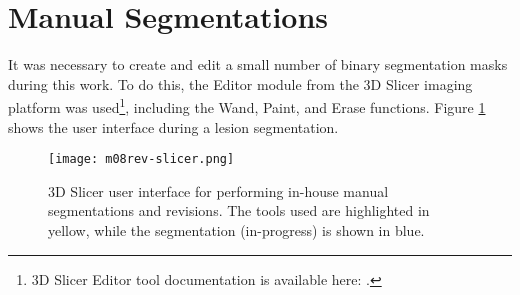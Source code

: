 \section{Manual Segmentations}
It was necessary to create and edit a small number of binary segmentation masks during this work. To do this, the Editor module from the 3D Slicer imaging platform \cite{Fedorov2012} was used\footnote{3D Slicer Editor tool documentation is available here: .}, including the Wand, Paint, and Erase functions. Figure \ref{fig:m08-rev-slicer} shows the user interface during a lesion segmentation.
\begin{figure}[h]
  \centering
  \texttt{[image: m08rev-slicer.png]}
  \caption{3D Slicer user interface for performing in-house manual segmentations and revisions. The tools used are highlighted in yellow, while the segmentation (in-progress) is shown in blue.}
  \label{fig:m08-rev-slicer}
\end{figure}
